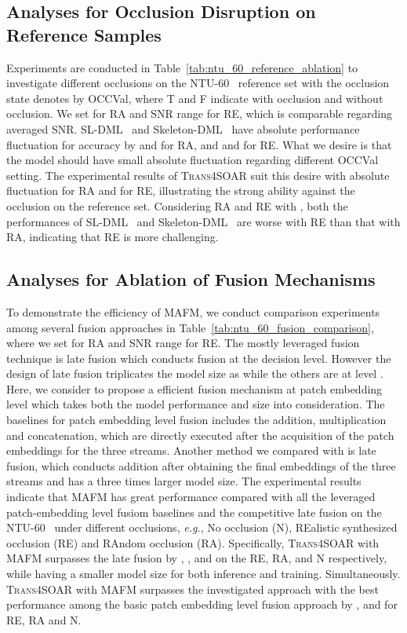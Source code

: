 \documentclass[lettersize,journal]{IEEEtran}
\begin{document}
\subsection{Analyses for Occlusion Disruption on Reference Samples}
Experiments are conducted in Table~\ref{tab:ntu_60_reference_ablation} to investigate different occlusions on the NTU-60~\cite{shahroudy2016ntu} reference set with the occlusion state denotes by OCCVal, where T and F indicate with occlusion and without occlusion. We set  for RA and SNR range  for RE, which is comparable regarding averaged SNR. SL-DML~\cite{memmesheimer2021sl} and Skeleton-DML~\cite{memmesheimer2020skeleton_dml} have absolute performance fluctuation for accuracy by  and  for RA, and  and  for RE. What we desire is that the model should have small absolute fluctuation regarding different OCCVal setting. The experimental results of \textsc{Trans4SOAR} suit this desire with absolute fluctuation  for RA and  for RE, illustrating the strong ability against the occlusion on the reference set. Considering RA and RE with , both the performances of SL-DML~\cite{memmesheimer2021sl} and Skeleton-DML~\cite{memmesheimer2020skeleton_dml} are worse with RE than that with RA, indicating that RE is more challenging.
\subsection{Analyses for Ablation of Fusion Mechanisms}
To demonstrate the efficiency of MAFM, we conduct comparison experiments among several fusion approaches in Table~\ref{tab:ntu_60_fusion_comparison}, where we set  for RA and SNR range  for RE.
The mostly leveraged fusion technique is late fusion which conducts fusion at the decision level.
However the design of late fusion triplicates the model size as  while the others are at  level .
Here, we consider to propose a efficient fusion mechanism at patch embedding level which takes both the model performance and size into consideration.
The baselines for patch embedding level fusion includes the addition, multiplication and concatenation, which are directly executed after the acquisition of the patch embeddings for the three streams.
Another method we compared with is late fusion, which conducts addition after obtaining the final embeddings of the three streams and has a three times larger model size. 
The experimental results indicate that MAFM has great performance compared with all the leveraged patch-embedding level fusiom baselines and the competitive late fusion on the NTU-60~\cite{shahroudy2016ntu} under different occlusions, \textit{e.g.}, No occlusion (N), REalistic synthesized occlusion (RE) and RAndom occlusion (RA). Specifically, \textsc{Trans4SOAR} with MAFM surpasses the late fusion by , , and  on the RE, RA, and N respectively, while having a smaller model size for both inference and training.
Simultaneously. \textsc{Trans4SOAR} with MAFM surpasses the investigated approach with the best performance among the basic patch embedding level fusion approach by ,  and  for RE, RA and N.
\end{document}
